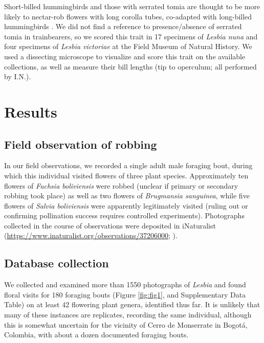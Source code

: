 \documentclass[fleqn,10pt,lineno]{wlpeerj}
\begin{document}
Short-billed hummingbirds and those with serrated tomia are thought to be more likely to nectar-rob flowers with long corolla tubes, co-adapted with long-billed hummingbirds \citep{lara2001}. 
We did not find a reference to presence/absence of serrated tomia in trainbearers, so we scored this trait in 17 specimens of \textit{Lesbia nuna} and four specimens of \textit{Lesbia victoriae} at the Field Museum of Natural History. %
We used a dissecting microscope to visualize and score this trait on the available collections, as well as measure their bill lengths (tip to operculum; all performed by I.N.). 
\\ 

\section*{Results}

\subsection*{Field observation of robbing}
In our field observations, we recorded a single adult male foraging bout, during which this individual visited flowers of three plant species. Approximately ten flowers of \textit{Fuchsia boliviensis} were robbed (unclear if primary or secondary robbing took place) as well as two flowers of \textit{Brugmansia sanguinea}, while five flowers of \textit{Salvia boliviensis} were apparently legitimately visited (ruling out or confirming pollination success requires controlled experiments). 
Photographs collected in the course of observations were deposited in iNaturalist (\href{https://www.inaturalist.org/observations/37206000}{https://www.inaturalist.org/observations/37206000}; \citealt{inaturalist}).

\subsection*{Database collection}
We collected and examined more than 1550 photographs of \textit{Lesbia} and found floral visits for 180 foraging bouts (Figure \ref{fig:fig1}, and Supplementary Data Table) on at least 42 flowering plant genera, identified thus far. %
It is unlikely that many of these instances are replicates, recording the same individual, although this is somewhat uncertain for the vicinity of Cerro de Monserrate in Bogot\'a, Colombia, with about a dozen documented foraging bouts. 
\end{document}
